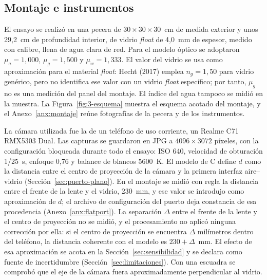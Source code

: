 \subsection{Montaje e instrumentos}
\label{sec:montaje}

El ensayo se realizó en una pecera de \mbox{$30 \times 30 \times 30$}~cm de medida exterior y unos 29,2~cm de profundidad interior, de vidrio \emph{float} de 4,0~mm de espesor, medido con calibre, llena de agua clara de red. Para el modelo óptico se adoptaron $\mu_a = 1{,}000$, $\mu_g = 1{,}500$ y $\mu_w = 1{,}333$. El valor del vidrio se usa como aproximación para el material \emph{float}: Hecht (2017) emplea $n_g = 1{,}50$ para vidrio genérico, pero no identifica ese valor con un vidrio \emph{float} específico; por tanto, $\mu_g$ no es una medición del panel del montaje. El índice del agua tampoco se midió en la muestra. La Figura~\ref{fig:3-esquema} muestra el esquema acotado del montaje, y el Anexo~\ref{anx:montaje} reúne fotografías de la pecera y de los instrumentos.

La cámara utilizada fue la de un teléfono de uso corriente, un Realme C71 RMX5303 Dual. Las capturas se guardaron en JPG a $4096 \times 3072$ píxeles, con la configuración bloqueada durante todo el ensayo: ISO 640, velocidad de obturación 1/25~s, enfoque 0,76 y balance de blancos 5600~K. El modelo de C define $d$ como la distancia entre el centro de proyección de la cámara y la primera interfaz aire--vidrio (Sección~\ref{sec:puerto-plano}). En el montaje se midió con regla la distancia entre el frente de la lente y el vidrio, 230~mm, y ese valor se introdujo como aproximación de $d$; el archivo de configuración del puerto deja constancia de esa procedencia (Anexo~\ref{anx:flatport}). La separación $\Delta$ entre el frente de la lente y el centro de proyección no se midió, y el procesamiento no aplicó ninguna corrección por ella: si el centro de proyección se encuentra $\Delta$ milímetros dentro del teléfono, la distancia coherente con el modelo es $230 + \Delta$~mm. El efecto de esa aproximación se acota en la Sección~\ref{sec:sensibilidad} y se declara como fuente de incertidumbre (Sección~\ref{sec:limitaciones}). Con una escuadra se comprobó que el eje de la cámara fuera aproximadamente perpendicular al vidrio.

